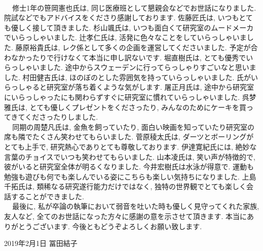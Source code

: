 \\\ \ \,修士1年の笹岡憲也氏は, 同じ医療班として懇親会などでお世話になりました. 院試などでもアドバイスをくださり感謝しております. 佐藤匠氏は, いつもとても優しく接して頂きました. 杉山颯氏は, いつも面白くて研究室のムードメーカでいらっしゃいました. 辻孝仁氏は, 活発に色々なことをしていらっしゃいました. 藤原裕貴氏は, レク係として多くの企画を運営してくださいました. 予定が合わなかったりで行けなくて本当に申し訳ないです. 堀直樹氏は, とても優秀でいらっしゃいました. 途中からスウェーデンに行ってらっしゃりすごいなと思いました. 村田健吉氏は, ほのぼのとした雰囲気を持っていらっしゃいました. 氏がいらっしゃると研究室が落ち着くような気がします. 屠正月氏は, 途中から研究室にいらっしゃったにも関わらずすぐに研究室に慣れていらっしゃいました. 呉梦雅氏は, とても優しくプレゼントをくださったり, みんなのためにケーキを買ってきてくださったりしました. 
\\\ \ \,同期の周楚凡氏は,  金魚を飼っていたり, 面白い映画を知っていたり研究室の席も隣でたくさん笑わせてもらいました. 菅原稜太氏は, ダーツとボーリングがとても上手で, 研究熱心でありとても尊敬しております. 伊達寛紀氏には, 絶妙な言葉のチョイスでいつも笑わせてもらいました. 山本凌氏は, 笑い声が特徴的で, 彼がいると研究室全体が明るくなりました. 今井宏樹氏は水泳が得意で. 運動も勉強も遊びも何でも楽しんでいる姿にこちらも楽しい気持ちになりました. 上島千拓氏は, 類稀なる研究遂行能力だけではなく, 独特の世界観でとても楽しく会話することができました. 
\\\ \ \,最後に, 私が卒論の執筆において弱音を吐いた時も優しく見守ってくれた家族, 友人など, 全てのお世話になった方々に感謝の意を示させて頂きます. 本当にありがとうございます. 今後ともどうぞよろしくお願い致します. 
\begin{flushright}
  2019年2月1日 冨田結子
\end{flushright}
